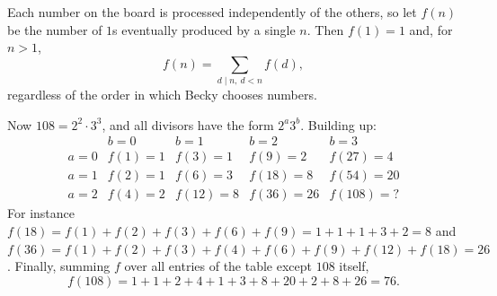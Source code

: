 Each number on the board is processed independently of the others, so let $f(n)$ be the number of $1$s eventually produced by a single $n$. Then $f(1)=1$ and, for $n>1$,
\[
f(n)=\sum_{d\mid n,\ d<n}f(d),
\]
regardless of the order in which Becky chooses numbers.

Now $108=2^2\cdot3^3$, and all divisors have the form $2^a3^b$. Building up:
\[
\begin{array}{c|cccc}
 & b=0 & b=1 & b=2 & b=3\\\hline
a=0 & f(1)=1 & f(3)=1 & f(9)=2 & f(27)=4\\
a=1 & f(2)=1 & f(6)=3 & f(18)=8 & f(54)=20\\
a=2 & f(4)=2 & f(12)=8 & f(36)=26 & f(108)=?
\end{array}
\]
For instance $f(18)=f(1)+f(2)+f(3)+f(6)+f(9)=1+1+1+3+2=8$ and $f(36)=f(1)+f(2)+f(3)+f(4)+f(6)+f(9)+f(12)+f(18)=26$. Finally, summing $f$ over all entries of the table except $108$ itself,
\[
f(108)=1+1+2+4+1+3+8+20+2+8+26=\boxed{76}.
\]
